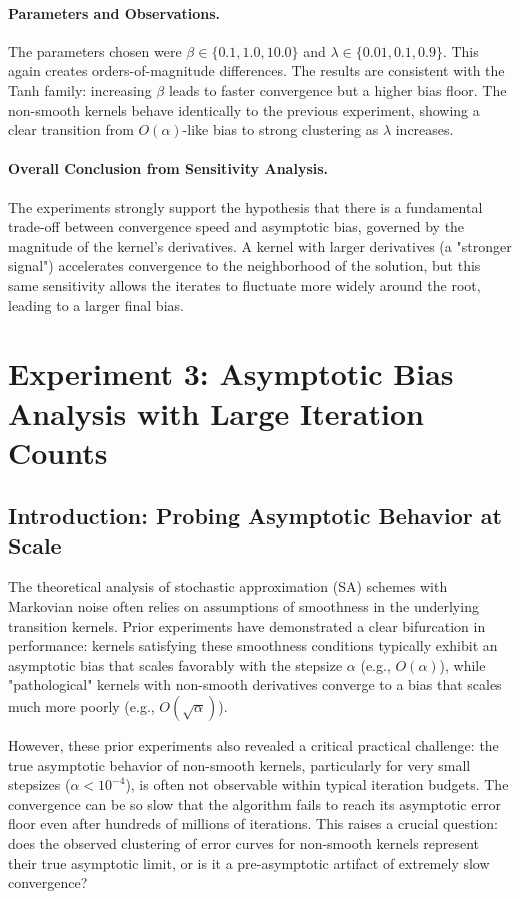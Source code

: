 \documentclass[a4paper]{article}
\begin{document}
\paragraph{Parameters and Observations.}
The parameters chosen were \(\beta \in \{0.1, 1.0, 10.0\}\) and \(\lambda \in \{0.01, 0.1, 0.9\}\). This again creates orders-of-magnitude differences. The results are consistent with the Tanh family: increasing \(\beta\) leads to faster convergence but a higher bias floor. The non-smooth kernels behave identically to the previous experiment, showing a clear transition from \(O(\alpha)\)-like bias to strong clustering as \(\lambda\) increases.

\paragraph{Overall Conclusion from Sensitivity Analysis.}
The experiments strongly support the hypothesis that there is a fundamental trade-off between convergence speed and asymptotic bias, governed by the magnitude of the kernel's derivatives. A kernel with larger derivatives (a "stronger signal") accelerates convergence to the neighborhood of the solution, but this same sensitivity allows the iterates to fluctuate more widely around the root, leading to a larger final bias.

\section*{Experiment 3: Asymptotic Bias Analysis with Large Iteration Counts}

\subsection*{Introduction: Probing Asymptotic Behavior at Scale}
The theoretical analysis of stochastic approximation (SA) schemes with Markovian noise often relies on assumptions of smoothness in the underlying transition kernels. Prior experiments have demonstrated a clear bifurcation in performance: kernels satisfying these smoothness conditions typically exhibit an asymptotic bias that scales favorably with the stepsize $\alpha$ (e.g., $O(\alpha)$), while "pathological" kernels with non-smooth derivatives converge to a bias that scales much more poorly (e.g., $O(\sqrt{\alpha})$).

However, these prior experiments also revealed a critical practical challenge: the true asymptotic behavior of non-smooth kernels, particularly for very small stepsizes ($\alpha < 10^{-4}$), is often not observable within typical iteration budgets. The convergence can be so slow that the algorithm fails to reach its asymptotic error floor even after hundreds of millions of iterations. This raises a crucial question: does the observed clustering of error curves for non-smooth kernels represent their true asymptotic limit, or is it a pre-asymptotic artifact of extremely slow convergence?
\end{document}
